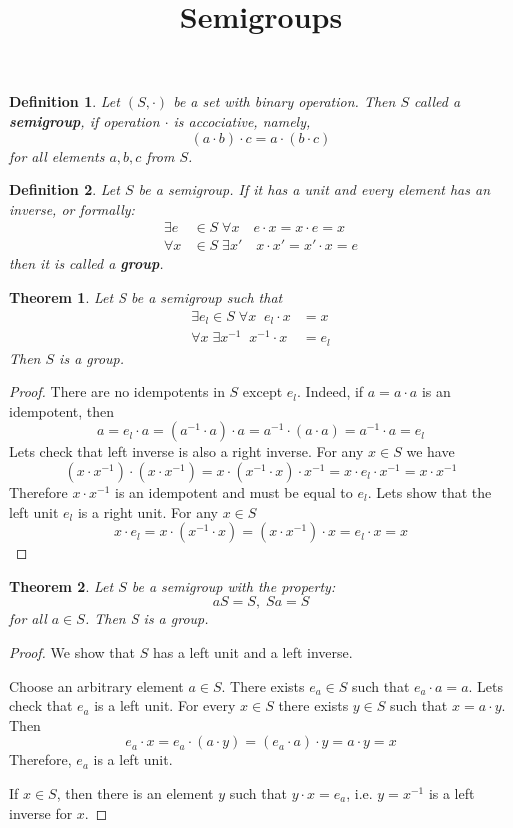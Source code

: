 \documentclass{article}
\title{Semigroups}
\newtheorem{definition}{Definition}
\newtheorem{thm}{Theorem}
\begin{document}
\maketitle
\begin{definition}
    Let $(S, \cdot)$ be a set with binary operation. 
    Then $S$ called a \textbf{semigroup}, if operation $\cdot$ is accociative, namely,
    \[
        (a\cdot b)\cdot c= a\cdot (b\cdot c)
        \] 
    for all elements $a, b, c$ from $S$.
\end{definition}
\begin{definition}
    Let $S$ be a semigroup. If it has a unit and every element 
    has an inverse, or formally:
    \begin{align}
        \exists e&\in S\;\forall x\quad e\cdot x=x\cdot e = x\\
        \forall x&\in S\;\exists x'\quad x\cdot x'= x'\cdot x = e
    \end{align}
    then it is called a \textbf{group}.
\end{definition}
\begin{thm}
    Let S be a semigroup such that
    \begin{align}
        \exists e_l\in S\;\forall x\;\; e_l\cdot x &= x\\
        \forall x\;\exists x^{-1}\;\; x^{-1}\cdot x &= e_l 
    \end{align}
    Then $S$ is a group.
\end{thm}
\begin{proof}
There are no idempotents in $S$ except $e_l$. Indeed, if $a=a\cdot a$ is an 
idempotent, then
\[
a = e_l\cdot a = (a^{-1}\cdot a)\cdot a = 
a^{-1}\cdot(a\cdot a) = a^{-1}\cdot a = e_l
\]
Lets check that left inverse is also a right inverse. For any $x\in S$ we have
\[
    (x\cdot x^{-1})\cdot (x\cdot x^{-1}) = x\cdot(x^{-1}\cdot x)\cdot x^{-1} =
    x\cdot e_l\cdot x^{-1} = x\cdot x^{-1}
\]
Therefore $x\cdot x^{-1}$ is an idempotent and must be equal to $e_l$.
Lets show that the left unit $e_l$ is a right unit. For any $x\in S$
\[
    x\cdot e_l = x\cdot(x^{-1}\cdot x) = (x\cdot x^{-1})\cdot x = 
    e_l\cdot x = x
\]
\end{proof}

\begin{thm}
    Let $S$ be a semigroup with the property:
    \[
        aS = S,\;Sa=S    
    \]
    for all $a\in S$. Then S is a group.
\end{thm}
\begin{proof}
    We show that $S$ has a left unit and a left inverse.

    Choose an arbitrary element $a\in S$. There exists $e_a\in S$ such that $e_a\cdot a = a$.
    Lets check that $e_a$ is a left unit. For every $x\in S$ there exists 
    $y\in S$ such that $x = a\cdot y$. Then
    \[
        e_a\cdot x = e_a\cdot(a\cdot y) = (e_a\cdot a)\cdot y=a\cdot y=x
        \]
    Therefore, $e_a$ is a left unit.

    If $x\in S$, then there is an element $y$ such that $y\cdot x=e_a$, i.e. $y=x^{-1}$
    is a left inverse for $x$.
\end{proof}
\end{document}
